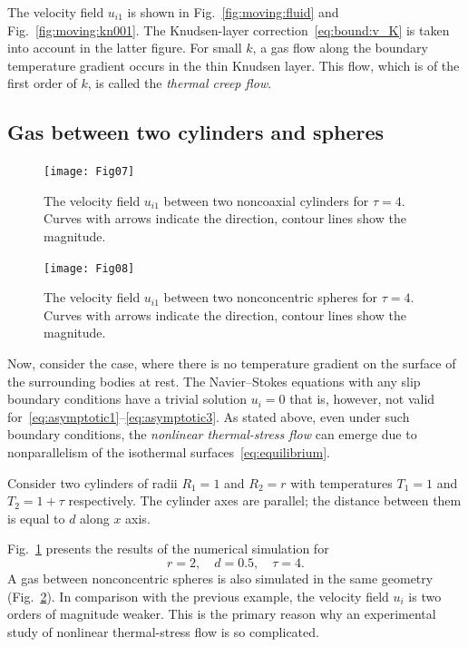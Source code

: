 \documentclass[smallextended, referee]{svjour3} %
\begin{document}
The velocity field \(u_{i1}\) is shown in Fig.~\ref{fig:moving:fluid} and Fig.~\ref{fig:moving:kn001}.
The Knudsen-layer correction~\eqref{eq:bound:v_K} is taken into account in the latter figure.
For small \(k\), a gas flow along the boundary temperature gradient occurs
in the thin Knudsen layer. This flow, which is of the first order of \(k\), is called
the \emph{thermal creep flow}.

\subsection{Gas between two cylinders and spheres}

\begin{figure}
    \centering
    \texttt{[image: Fig07]}
    \caption{The velocity field \(u_{i1}\) between two noncoaxial cylinders for \(\tau=4\).
        Curves with arrows indicate the direction, contour lines show the magnitude.}
    \label{fig:cylinders}
\end{figure}

\begin{figure}
    \centering
    \texttt{[image: Fig08]}
    \caption{The velocity field \(u_{i1}\) between two nonconcentric spheres for \(\tau=4\).
        Curves with arrows indicate the direction, contour lines show the magnitude.}
    \label{fig:spheres}
\end{figure}

Now, consider the case, where there is no temperature gradient on the surface of the surrounding bodies at rest.
The Navier--Stokes equations with any slip boundary conditions have a trivial solution \(u_i = 0\)
that is, however, not valid for~\eqref{eq:asymptotic1}--\eqref{eq:asymptotic3}.
As stated above, even under such boundary conditions, the \emph{nonlinear thermal-stress flow}
can emerge due to nonparallelism of the isothermal surfaces~\eqref{eq:equilibrium}.

Consider two cylinders of radii \(R_1 = 1\) and \(R_2 = r\)
with temperatures \(T_1 = 1\) and \(T_2 = 1+\tau\) respectively.
The cylinder axes are parallel; the distance between them is equal to \(d\) along \(x\) axis.

Fig.~\ref{fig:cylinders} presents the results of the numerical simulation for
\[ r = 2, \quad d = 0.5, \quad \tau = 4. \]
A gas between nonconcentric spheres is also simulated in the same geometry (Fig.~\ref{fig:spheres}).
In comparison with the previous example, the velocity field \(u_i\) is two orders of magnitude weaker.
This is the primary reason why an experimental study of nonlinear thermal-stress flow is so complicated.
\end{document}
